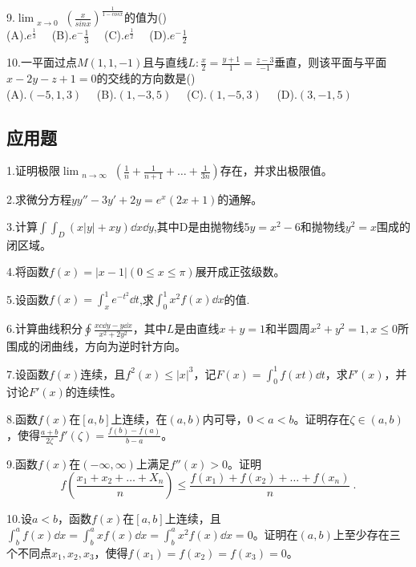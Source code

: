 9.$\displaystyle \lim_{\substack{x \to 0}} (\frac{x}{sinx})^{\frac{1}{1-cosx}}$的值为()\\
(A).$e^\frac{1}{3}\quad$     (B).$e^-\frac{1}{3}\quad$    (C).$e^\frac{1}{2}\quad$      (D).$e^-\frac{1}{2}\quad$

10.一平面过点$M(1,1,-1)$且与直线$L:\frac{x}{2}=\frac{y+1}{1}=\frac{z-3}{-1}$垂直，则该平面与平面$x-2y-z+1=0$的交线的方向数是()\\
(A).$(-5,1,3)\quad$  (B).$(1,-3,5)\quad$  (C).$(1,-5,3)\quad$   (D).$(3,-1,5)\quad$

\subsection{应用题}
1.证明极限$\displaystyle \lim_{\substack {n \to \infty}}(\frac{1}{n}+\frac{1}{n+1}+ \dots +\frac{1}{3n})$存在，并求出极限值。

2.求微分方程$yy''-3y'+2y=e^x(2x+1)$的通解。

3.计算$\int \int_{D}(x|y|+xy)\dd{x}\dd{y}$,其中D是由抛物线$5y=x^2-6$和抛物线$y^2=x$围成的闭区域。

4.将函数$f(x)=|x-1| (0\leqslant x \leqslant \pi)$展开成正弦级数。

5.设函数$f(x)=\int_{x}^{1}e^{-t^2}\dd{t}$,求$\int_{0}^{1}x^2f(x)\dd{x}$的值.

6.计算曲线积分$\oint \frac{xc\dd{y}-y\dd{x}}{x^2+2y^2}$，其中$L$是由直线$x+y=1$和半圆周$x^2+y^2=1,x \leqslant 0$所围成的闭曲线，方向为逆时针方向。

7.设函数$f(x)$连续，且$f^2(x) \leqslant {|x|}^3$，记$F(x)=\int_{0}^{1}f(xt)\dd{t}$，求$F'(x)$，并讨论$F'(x)$的连续性。

8.函数$f(x)$在$[a,b]$上连续，在$(a,b)$内可导，$0<a<b$。证明存在$\zeta \in(a,b)$，使得$\frac{a+b}{2\zeta}f'(\zeta)=\frac{f(b)-f(a)}{b-a}$。

9.函数$f(x)$在$(-\infty,\infty)$上满足$f''(x)>0$。证明
\begin{equation}
f(\frac{x_1+x_2+\dots+X_n}{n}) \leqslant \frac{f(x_1)+f(x_2)+\dots+f(x_n)}{n}~.
\end{equation}


10.设$a<b$，函数$f(x)$在$[a,b]$上连续，且$\int_{b}^{a}f(x)\dd{x}=\int_{b}^{a}xf(x)\dd{x}=\int_{b}^{a}x^2f(x)\dd{x}=0$。证明在$(a,b)$上至少存在三个不同点$x_1,x_2,x_3$，使得$f(x_1)=f(x_2)=f(x_3)=0$。